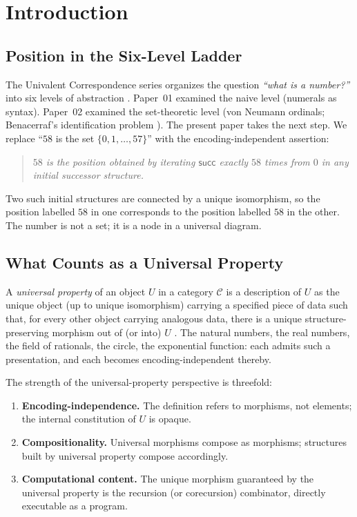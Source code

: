 \documentclass[12pt]{article}
\theoremstyle{definition}
\theoremstyle{remark}
\newcommand{\suc}{\mathsf{succ}}
\begin{document}
\section{Introduction}
\label{sec:intro}

\subsection{Position in the Six-Level Ladder}

The Univalent Correspondence series organizes the question \emph{``what is a number?''} into six levels of abstraction \cite{KnowledgeBase2026}. Paper~01 examined the naive level (numerals as syntax). Paper~02 examined the set-theoretic level (von Neumann ordinals; Benacerraf's identification problem \cite{Benacerraf1965}). The present paper takes the next step. We replace ``$58$ is the set $\{0, 1, \dots, 57\}$'' with the encoding-independent assertion:
\begin{quote}
\itshape
$58$ is the position obtained by iterating $\suc$ exactly $58$ times from $0$ in any initial successor structure.
\end{quote}
Two such initial structures are connected by a unique isomorphism, so the position labelled $58$ in one corresponds to the position labelled $58$ in the other. The number is not a set; it is a node in a universal diagram.

\subsection{What Counts as a Universal Property}

A \emph{universal property} of an object $U$ in a category $\mathcal{C}$ is a description of $U$ as the unique object (up to unique isomorphism) carrying a specified piece of data such that, for every other object carrying analogous data, there is a unique structure-preserving morphism out of (or into) $U$ \cite{MacLane1998,Riehl2016}. The natural numbers, the real numbers, the field of rationals, the circle, the exponential function: each admits such a presentation, and each becomes encoding-independent thereby.

The strength of the universal-property perspective is threefold:
\begin{enumerate}
  \item \textbf{Encoding-independence.} The definition refers to morphisms, not elements; the internal constitution of $U$ is opaque.
  \item \textbf{Compositionality.} Universal morphisms compose as morphisms; structures built by universal property compose accordingly.
  \item \textbf{Computational content.} The unique morphism guaranteed by the universal property is the recursion (or corecursion) combinator, directly executable as a program.
\end{enumerate}
\end{document}
